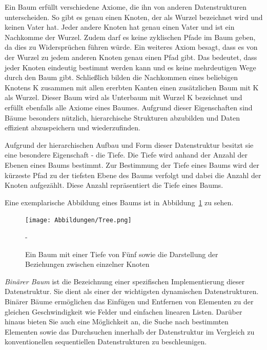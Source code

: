 Ein Baum erfüllt verschiedene Axiome, die ihn von anderen Datenstrukturen unterscheiden. So gibt es genau einen Knoten, der als Wurzel bezeichnet wird und keinen Vater hat. Jeder andere Knoten hat genau einen Vater und ist ein Nachkomme der Wurzel. Zudem darf es keine zyklischen Pfade im Baum geben, da dies zu Widersprüchen führen würde. Ein weiteres Axiom besagt, dass es von der Wurzel zu jedem anderen Knoten genau einen Pfad gibt. Das bedeutet, dass jeder Knoten eindeutig bestimmt werden kann und es keine mehrdeutigen Wege durch den Baum gibt. Schließlich bilden die Nachkommen eines beliebigen Knotens K zusammen mit allen ererbten Kanten einen zusätzlichen Baum mit K als Wurzel. Dieser Baum wird als Unterbaum mit Wurzel K bezeichnet und erfüllt ebenfalls alle Axiome eines Baumes. Aufgrund dieser Eigenschaften sind Bäume besonders nützlich, hierarchische Strukturen abzubilden und Daten effizient abzuspeichern und wiederzufinden. \autocite[389]{gumm_band_2016}

Aufgrund der hierarchischen Aufbau und Form dieser Datenstruktur besitzt sie eine besondere Eigenschaft - die Tiefe. Die Tiefe wird anhand der Anzahl der Ebenen eines Baums bestimmt. Zur Bestimmung der Tiefe eines Baums wird der kürzeste Pfad zu der tiefsten Ebene des Baums verfolgt und dabei die Anzahl der Knoten aufgezählt. Diese Anzahl repräsentiert die Tiefe eines Baums. \autocite[390]{gumm_band_2016}

Eine exemplarische Abbildung eines Baums ist in Abbildung~\ref{fig: tree} zu sehen.

\begin{figure}[t]
	\texttt{[image: Abbildungen/Tree.png]}
	\centering
	\caption{Ein Baum mit einer Tiefe von Fünf sowie die Darstellung der Beziehungen zwischen einzelner Knoten \autocite[390]{gumm_band_2016}}-
	\label{fig: tree}
\end{figure}

\textit{Binärer Baum} ist die Bezeichnung einer spezifischen Implementierung dieser Datenstruktur. Sie dient als einer der wichtigsten dynamischen Datenstrukturen. Binärer Bäume ermöglichen das Einfügen und Entfernen von Elementen zu der gleichen Geschwindigkeit wie Felder und einfachen linearen Listen. Darüber hinaus bieten Sie auch eine Möglichkeit an, die Suche nach bestimmten Elementen sowie das Durchsuchen innerhalb der Datenstruktur im Vergleich zu konventionellen sequentiellen Datenstrukturen zu beschleunigen. \autocite[617]{ernst_grundkurs_2020}

